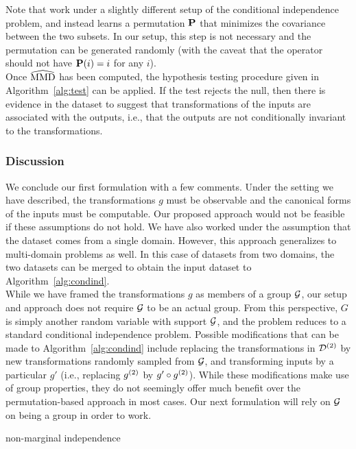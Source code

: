Note that \textcite{Doran:2014} work under a slightly different setup of the conditional independence problem, and instead learns a permutation $\mathbf{P}$ that minimizes the covariance between the two subsets. In our setup, this step is not necessary and the permutation can be generated randomly (with the caveat that the operator should not have $\mathbf{P}(i)=i$ for any $i$).
\\

Once $\widehat{\mathrm{MMD}}$ has been computed, the hypothesis testing procedure given in Algorithm~\ref{alg:test} can be applied. If the test rejects the null, then there is evidence in the dataset to suggest that transformations of the inputs are associated with the outputs, i.e., that the outputs are not conditionally invariant to the transformations.

\subsubsection{Discussion}

We conclude our first formulation with a few comments. Under the setting we have described, the transformations $g$ must be observable and the canonical forms of the inputs must be computable. Our proposed approach would not be feasible if these assumptions do not hold. We have also worked under the assumption that the dataset comes from a single domain. However, this approach generalizes to multi-domain problems as well. In this case of datasets from two domains, the two datasets can be merged to obtain the input dataset to Algorithm~\ref{alg:condind}.
\\

While we have framed the transformations $g$ as members of a group $\mathcal{G}$, our setup and approach does not require $\mathcal{G}$ to be an actual group. From this perspective, $G$ is simply another random variable with support $\mathcal{G}$, and the problem reduces to a standard conditional independence problem. Possible modifications that can be made to Algorithm~\ref{alg:condind} include replacing the transformations in $\mathcal{D}^{(2)}$ by new transformations randomly sampled from $\mathcal{G}$, and transforming inputs by a particular $g'$ (i.e., replacing $g^{(2)}$ by $g'\circ g^{(2)}$). While these modifications make use of group properties, they do not seemingly offer much benefit over the permutation-based approach in most cases. Our next formulation will rely on $\mathcal{G}$ on being a group in order to work.

\todo non-marginal independence

